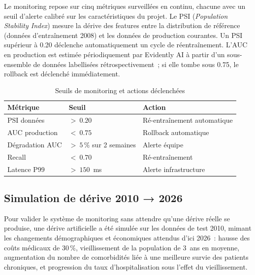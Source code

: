 Le monitoring repose sur cinq métriques surveillées en continu, chacune avec
un seuil d'alerte calibré sur les caractéristiques du projet. Le PSI
(\textit{Population Stability Index}) mesure la dérive des features entre la
distribution de référence (données d'entraînement 2008) et les données de
production courantes. Un PSI supérieur à 0.20 déclenche automatiquement un
cycle de réentraînement. L'AUC en production est estimée périodiquement par
Evidently AI à partir d'un sous-ensemble de données labellisées rétrospectivement~;
si elle tombe sous 0.75, le rollback est déclenché immédiatement.

\begin{table}[htbp]
\centering
\caption{Seuils de monitoring et actions déclenchées}
\label{tab:monitoring}
\begin{tabular}{@{}lll@{}}
\toprule
\textbf{Métrique} & \textbf{Seuil} & \textbf{Action} \\
\midrule
PSI données          & $>~0.20$                  & Ré-entraînement automatique \\
AUC production       & $<~0.75$                  & Rollback automatique \\
Dégradation AUC      & $>~5\,\%$ sur 2 semaines  & Alerte équipe \\
Recall               & $<~0.70$                  & Ré-entraînement \\
Latence P99          & $>~150$~ms                & Alerte infrastructure \\
\bottomrule
\end{tabular}
\end{table}

\subsection{Simulation de dérive 2010 → 2026}

Pour valider le système de monitoring sans attendre qu'une dérive réelle se
produise, une dérive artificielle a été simulée sur les données de test 2010,
mimant les changements démographiques et économiques attendus d'ici 2026~: hausse
des coûts médicaux de 30\,\%, vieillissement de la population de 3~ans en moyenne,
augmentation du nombre de comorbidités liée à une meilleure survie des patients
chroniques, et progression du taux d'hospitalisation sous l'effet du vieillissement.


